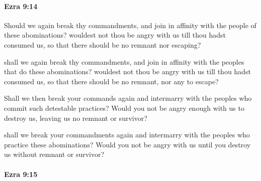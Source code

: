 		\paragraph{Ezra 9:14} %
			\label{EZRA-9-14}

			Should we again break thy commandments, and join in affinity with the people of these abominations? wouldest not thou be angry with us till thou hadst consumed us, so that there should be no remnant nor escaping?

			\begin{versebox}
					\item[BHS] 
					\item[LXX] 
					\item[ASV] shall we again break thy commandments, and join in affinity with the peoples that do these abominations? wouldest not thou be angry with us till thou hadst consumed us, so that there should be no remnant, nor any to escape?
					\item[NIV] Shall we then break your commands again and intermarry with the peoples who commit such detestable practices? Would you not be angry enough with us to destroy us, leaving us no remnant or survivor?
					\item[NRSV] shall we break your commandments again and intermarry with the peoples who practice these abominations? Would you not be angry with us until you destroy us without remnant or survivor?
			\end{versebox}

		\paragraph{Ezra 9:15} %
			\label{EZRA-9-15}

